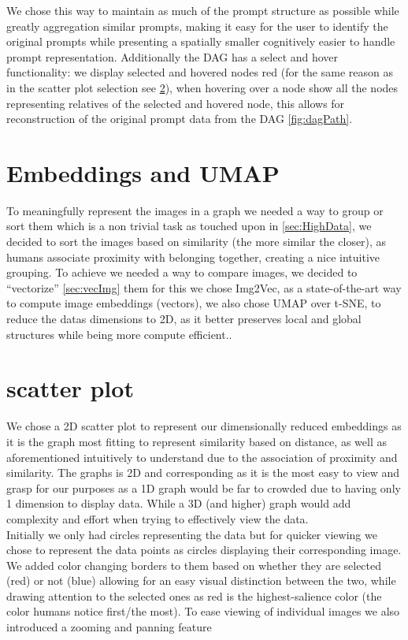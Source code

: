 \documentclass[
  a4paper,  %
  twoside,  %
  bibliography=totoc,
  headsepline,
  cleardoublepage=empty,
  parskip=half,
  draft=false
]{scrbook}
\begin{document}
We chose this way to maintain as much of the prompt structure as possible while greatly aggregation similar prompts, making it easy for the user to identify the original prompts while presenting a spatially smaller cognitively easier to handle prompt representation. Additionally the DAG has a select and hover functionality: we display selected and hovered nodes red (for the same reason as in the scatter plot selection see \cref{sec:scatter}), when hovering over a node show all the nodes representing relatives of the selected and hovered node, this allows for reconstruction of the original prompt data from the DAG \cref{fig:dagPath}.  


\section{Embeddings and UMAP}
To meaningfully represent the images in a graph we needed a way to group or sort them which is a non trivial task as touched upon in \cref{sec:HighData}, we decided to sort the images based on similarity (the more similar the closer), as humans associate proximity with belonging together, creating a nice intuitive grouping. To achieve we needed a way to compare images, we decided to \enquote{vectorize} \cref{sec:vecImg} them for this we chose Img2Vec, as a state-of-the-art way to compute image embeddings (vectors), we also chose UMAP over t-SNE, to reduce the datas dimensions to 2D, as it better preserves local and global structures while being more compute efficient..
\section{scatter plot}
\label{sec:scatter}
We chose a 2D scatter plot to represent our dimensionally reduced embeddings as it is the graph most fitting to represent similarity based on distance, as well as aforementioned intuitively to understand due to the association of proximity and similarity. The graphs is 2D and corresponding as it is the most easy to view and grasp for our purposes as a 1D graph would be far to crowded due to having only 1 dimension to display data. While a 3D (and higher) graph would add complexity and effort when trying to effectively view the data.\\
Initially we only had circles representing the data but for quicker viewing we chose to represent the data points as circles displaying their corresponding image. We added color changing borders to them based on whether they are selected (red) or not (blue) allowing for an easy visual distinction between the two, while drawing attention to the selected ones as red is the highest-salience color (the color humans notice first/the most). To ease viewing of individual images we also introduced a zooming and panning feature
\end{document}
